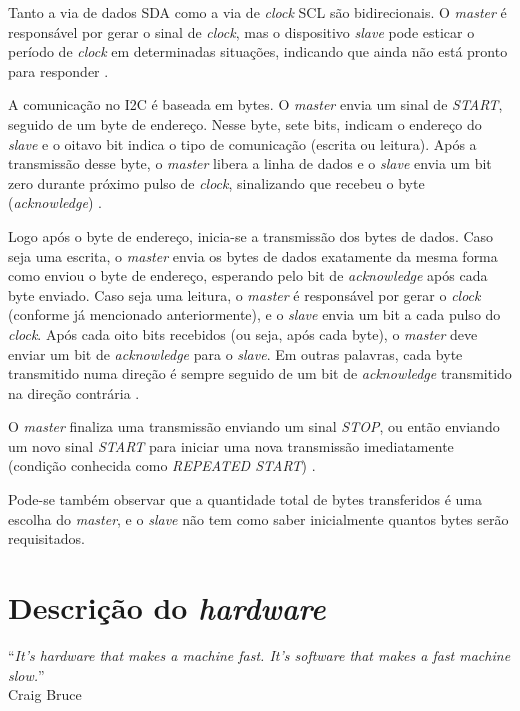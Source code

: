 \documentclass[brazil,pagestart=firstchapter]{abnt}
\begin{document}
Tanto a via de dados \ac{SDA} como a via de \textit{clock} \ac{SCL} são
bidirecionais. O \textit{master} é responsável por gerar o sinal de
\textit{clock}, mas o dispositivo \textit{slave} pode esticar o período de
\textit{clock} em determinadas situações, indicando que ainda não está
pronto para responder \cite{UM10204}.

A comunicação no \ac{I2C} é baseada em bytes. O \textit{master} envia um
sinal de \textit{START}, seguido de um byte de endereço. Nesse byte, sete
bits, indicam o endereço do \textit{slave} e o oitavo bit indica o tipo de
comunicação (escrita ou leitura). Após a transmissão desse byte, o
\textit{master} libera a linha de dados e o \textit{slave} envia um bit zero
durante próximo pulso de \textit{clock}, sinalizando que recebeu o byte
(\textit{acknowledge}) \cite{AVR315}.

Logo após o byte de endereço, inicia-se a transmissão dos bytes de dados.
Caso seja uma escrita, o \textit{master} envia os bytes de dados exatamente
da mesma forma como enviou o byte de endereço, esperando pelo bit de
\textit{acknowledge} após cada byte enviado. Caso seja uma leitura, o
\textit{master} é responsável por gerar o \textit{clock} (conforme já
mencionado anteriormente), e o \textit{slave} envia um bit a cada pulso do
\textit{clock}. Após cada oito bits recebidos (ou seja, após cada byte), o
\textit{master} deve enviar um bit de \textit{acknowledge} para o
\textit{slave}. Em outras palavras, cada byte transmitido numa direção é
sempre seguido de um bit de \textit{acknowledge} transmitido na direção
contrária \cite{AVR315}.

O \textit{master} finaliza uma transmissão enviando um sinal \textit{STOP},
ou então enviando um novo sinal \textit{START} para iniciar uma nova
transmissão imediatamente (condição conhecida como \textit{REPEATED START})
\cite{ATmega8}.

Pode-se também observar que a quantidade total de bytes transferidos é uma
escolha do \textit{master}, e o \textit{slave} não tem como saber
inicialmente quantos bytes serão requisitados.


\chapter{Descrição do \textit{hardware}}
\label{cap:hardware}


\vfill{}
\begin{flushright}{}
``\emph{It's hardware that makes a machine fast. It's software that makes a
fast machine slow.}''\\
{\small Craig Bruce}
\end{flushright}{\small \par}
\vfill{}
\end{document}
